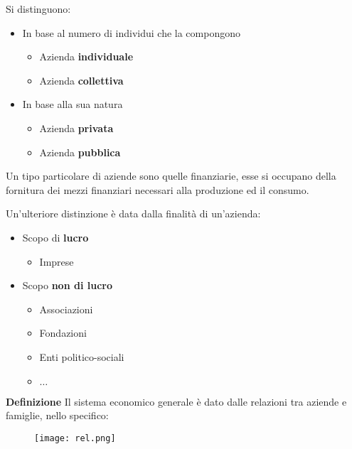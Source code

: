 \documentclass{article}
\newcommand{\df}{\noindent\textbf{Definizione }}
\begin{document}
\noindent Si distinguono:
\begin{itemize}
    \item In base al numero di individui che la compongono
        \begin{itemize}
            \item Azienda \textbf{individuale}
            \item Azienda \textbf{collettiva}
        \end{itemize}
    \item In base alla sua natura
        \begin{itemize}
            \item Azienda \textbf{privata}
            \item Azienda \textbf{pubblica}\newline
        \end{itemize}
\end{itemize}

\noindent Un tipo particolare di aziende sono quelle finanziarie, esse si occupano della fornitura dei mezzi finanziari necessari alla produzione ed il consumo.\newline

\noindent Un'ulteriore distinzione è data dalla finalità di un'azienda:
\begin{itemize}
    \item Scopo di \textbf{lucro}
        \begin{itemize}
            \item Imprese
        \end{itemize}
    \item Scopo \textbf{non di lucro}
        \begin{itemize}
            \item Associazioni
            \item Fondazioni
            \item Enti politico-sociali
            \item $\ldots$
        \end{itemize}
\end{itemize}

\newpage

\df Il sistema economico generale è dato dalle relazioni tra aziende e famiglie, nello specifico:

\begin{figure}[ht]
    \centering
    \texttt{[image: rel.png]}
\end{figure}
\end{document}
